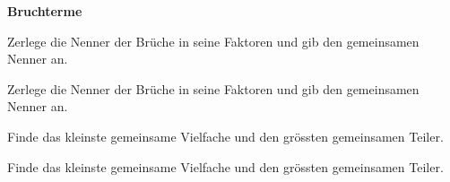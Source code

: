 \documentclass[11pt]{exam}
\newcommand{\theme}{Bruchterme}
\begin{document}
\fontsize{14}{14}\selectfont
\begin{center}
    \huge\bf\theme
\end{center}

\begin{questions}
\question[4] %
Zerlege die Nenner der Brüche in seine Faktoren und gib den gemeinsamen Nenner an.

\question[4] %
Zerlege die Nenner der Brüche in seine Faktoren und gib den gemeinsamen Nenner an.

\question[4] %
Finde das kleinste gemeinsame Vielfache und den grössten gemeinsamen Teiler.

\question[4] %
Finde das kleinste gemeinsame Vielfache und den grössten gemeinsamen Teiler.
\begin{parcols}[2]

\end{parcols}
\end{questions}
\end{document}
